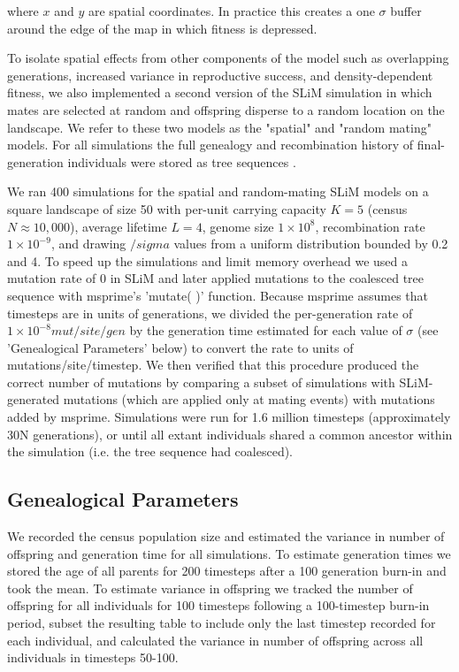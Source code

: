 \documentclass[10pt,twoside,lineno]{gsajnl}
\newif\ifcomments
\newcommand{\ak}[1]{\ifcomments{{\color{red} \it (#1)}}\else{}\fi}
\begin{document}
where $x$ and $y$ are spatial coordinates. In practice this creates a one $\sigma$ buffer around the edge of the map in which fitness is depressed.

To isolate spatial effects from other components of the model such as overlapping generations, increased variance in reproductive success, and density-dependent fitness, we  also implemented a second version of the SLiM simulation in which mates are selected at random and offspring disperse to a random location on the landscape. We refer to these two models as the "spatial" and "random mating" models. For all simulations the full genealogy and recombination history of final-generation individuals were stored as tree sequences \citep{Kelleher2018}. \ak{add a link to the github repo with code}

We ran 400 simulations for the spatial and random-mating SLiM models on a square landscape of size 50 with per-unit carrying capacity $K=5$ (census $N \approx 10,000$), average lifetime $L=4$, genome size $1\times10^{8}$, recombination rate $1\times10^{-9}$, and drawing $/sigma$ values from a uniform distribution bounded by 0.2 and 4. To speed up the simulations and limit memory overhead we used a mutation rate of 0 in SLiM and later applied mutations to the coalesced tree sequence with msprime's 'mutate( )' function. Because msprime assumes that timesteps are in units of generations, we divided the per-generation rate of $1\times10^{-8} mut/site/gen$ by the generation time estimated for each value of $\sigma$ (see 'Genealogical Parameters' below) to convert the rate to units of mutations/site/timestep. We then verified that this procedure produced the correct number of mutations by comparing a subset of simulations with SLiM-generated mutations (which are applied only at mating events) with mutations added by msprime. Simulations were run for 1.6 million timesteps (approximately 30N generations), or until all extant individuals shared a common ancestor within the simulation (i.e. the tree sequence had coalesced). \ak{maybe worth including a table with some basic runtime results in the supplement?}

\subsection{Genealogical Parameters}
We recorded the census population size and estimated the variance in number of offspring and generation time \ak{need to explain why this is needed} for all simulations. To estimate generation times we stored the age of all parents for 200 timesteps after a 100 generation burn-in and took the mean. To estimate variance in offspring we tracked the number of offspring for all individuals for 100 timesteps following a 100-timestep burn-in period, subset the resulting table to include only the last timestep recorded for each individual, and calculated the variance in number of offspring across all individuals in timesteps 50-100.
\end{document}
